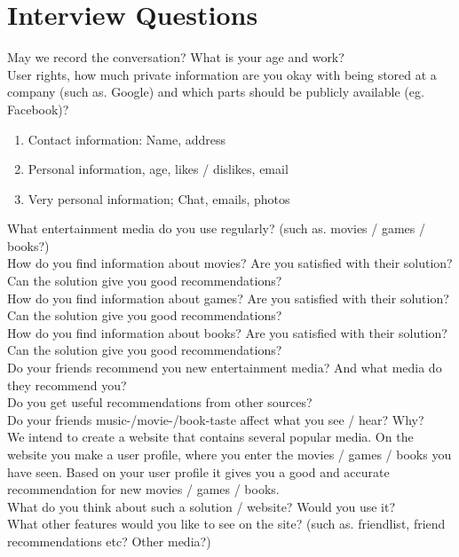 \chapter{Interview Questions}
May we record the conversation?
What is your age and work?\\

User rights, how much private information are you okay with being stored at a company (such as. Google) and which parts should be publicly available (eg. Facebook)?
\begin{enumerate}
\item Contact information: Name, address
\item Personal information, age, likes / dislikes, email
\item Very personal information; Chat, emails, photos
\end{enumerate}
 
What entertainment media do you use regularly? (such as. movies / games / books?)\\
 
How do you find information about movies? Are you satisfied with their solution?\\ Can the solution give you good recommendations?\\
How do you find information about games? Are you satisfied with their solution? Can the solution give you good recommendations?\\
How do you find information about books? Are you satisfied with their solution? Can the solution give you good recommendations?\\
 
Do your friends recommend you new entertainment media? And what media do they recommend you?\\
Do you get useful recommendations from other sources?\\
Do your friends music-/movie-/book-taste affect what you see / hear? Why?\\

We intend to create a website that contains several popular media. On the website you make a user profile, where you enter the movies / games / books you have seen. Based on your user profile it gives you a good and accurate recommendation for new movies / games / books.\\

What do you think about such a solution / website? Would you use it?\\

What other features would you like to see on the site? (such as. friendlist, friend recommendations etc? Other media?)\\

